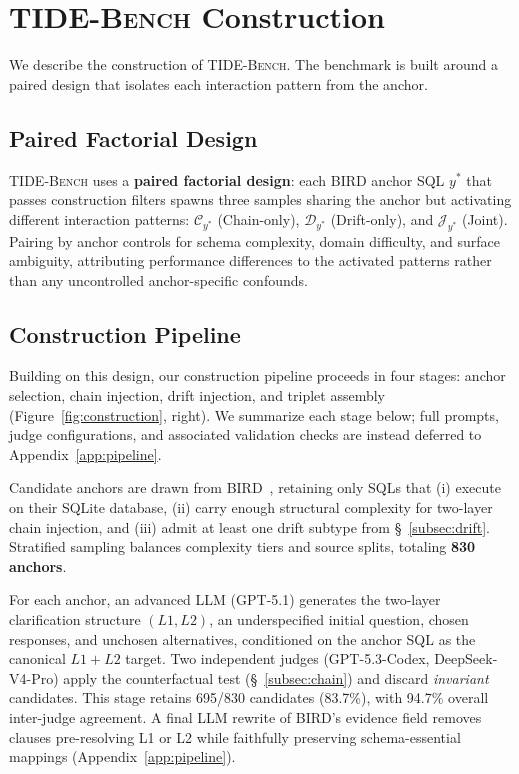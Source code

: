 \section{\textsc{TIDE-Bench} Construction}
\label{sec:construction}


We describe the construction of \textsc{TIDE-Bench}. The benchmark is built around a paired design that isolates each interaction pattern from the anchor.

\subsection{Paired Factorial Design}
\label{subsec:paired-factorial}

\textsc{TIDE-Bench} uses a \textbf{paired factorial design}: each BIRD anchor SQL $y^*$ that passes construction filters spawns three samples sharing the anchor but activating different interaction patterns: $\mathcal{C}_{y^*}$ (Chain-only), $\mathcal{D}_{y^*}$ (Drift-only), and $\mathcal{J}_{y^*}$ (Joint). Pairing by anchor controls for schema complexity, domain difficulty, and surface ambiguity, attributing performance differences to the activated patterns rather than any uncontrolled anchor-specific confounds.

\subsection{Construction Pipeline}
\label{subsec:pipeline}

Building on this design, our construction pipeline proceeds in four stages: anchor selection, chain injection, drift injection, and triplet assembly (Figure~\ref{fig:construction}, right). We summarize each stage below; full prompts, judge configurations, and associated validation checks are instead deferred to Appendix~\ref{app:pipeline}.



 Candidate anchors are drawn from BIRD~\citep{li2023bird}, retaining only SQLs that (i) execute on their SQLite database, (ii) carry enough structural complexity for two-layer chain injection, and (iii) admit at least one drift subtype from \S~\ref{subsec:drift}. Stratified sampling balances complexity tiers and source splits, totaling \textbf{830 anchors}.

 For each anchor, an advanced LLM (GPT-5.1) generates the two-layer clarification structure $(L1, L2)$, an underspecified initial question, chosen responses, and unchosen alternatives, conditioned on the anchor SQL as the canonical $L1 + L2$ target. Two independent judges (GPT-5.3-Codex, DeepSeek-V4-Pro) apply the counterfactual test (\S~\ref{subsec:chain}) and discard \emph{invariant} candidates. This stage retains 695/830 candidates (83.7\%), with 94.7\% overall inter-judge agreement. A final LLM rewrite of BIRD's evidence field removes clauses pre-resolving L1 or L2 while faithfully preserving schema-essential mappings (Appendix~\ref{app:pipeline}).

